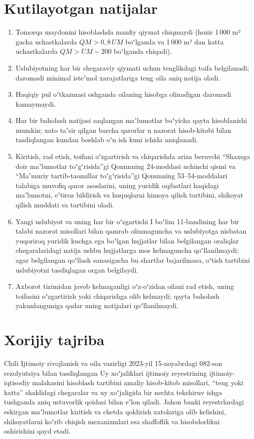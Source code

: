 \documentclass[14pt,a4paper]{extarticle}
\begin{document}
\section{Kutilayotgan natijalar}
\begin{enumerate}[leftmargin=1.27cm]
\item Tomorqa maydonini hisoblashda manfiy qiymat chiqmaydi (hozir 1\,000 m² gacha uchastkalarda $QM>0{,}8\,UM$ boʻlganda va 1\,000 m² dan katta uchastkalarda $QM>UM-200$ boʻlganda chiqadi).
\item Uslubiyotning har bir chegaraviy qiymati uchun tenglikdagi toifa belgilanadi; daromadi minimal isteʼmol xarajatlariga teng oila aniq natija oladi.
\item Haqiqiy pul oʻtkazmasi oshganda oilaning hisobga olinadigan daromadi kamaymaydi.
\item Har bir baholash natijasi saqlangan maʼlumotlar boʻyicha qayta hisoblanishi mumkin; xato taʼsir qilgan barcha qarorlar u nazorat hisob-kitobi bilan tasdiqlangan kundan boshlab oʻn ish kuni ichida aniqlanadi.
\item Kiritish, rad etish, toifani oʻzgartirish va chiqarishda ariza beruvchi “Shaxsga doir maʼlumotlar toʻgʻrisida”gi Qonunning 24-moddasi uchinchi qismi va “Maʼmuriy tartib-taomillar toʻgʻrisida”gi Qonunning 53–54-moddalari talabiga muvofiq qaror asoslarini, uning yuridik oqibatlari haqidagi maʼlumotni, eʼtiroz bildirish va huquqlarni himoya qilish tartibini, shikoyat qilish muddati va tartibini oladi.
\item Yangi uslubiyot va uning har bir oʻzgartishi I boʻlim 11-bandining har bir talabi nazorat misollari bilan qamrab olinmaguncha va uslubiyotga nisbatan yuqoriroq yuridik kuchga ega boʻlgan hujjatlar bilan belgilangan oraliqlar chegaralaridagi natija ushbu hujjatlarga mos kelmaguncha qoʻllanilmaydi; agar belgilangan qoʻllash sanasigacha bu shartlar bajarilmasa, oʻtish tartibini uslubiyotni tasdiqlagan organ belgilaydi.
\item Axborot tizimidan javob kelmaganligi oʻz-oʻzidan oilani rad etish, uning toifasini oʻzgartirish yoki chiqarishga olib kelmaydi; qayta baholash yakunlanguniga qadar uning natijalari qoʻllanilmaydi.
\end{enumerate}

\section{Xorijiy tajriba}
Chili Ijtimoiy rivojlanish va oila vazirligi 2023-yil 15-noyabrdagi 082-son rezolyutsiya bilan tasdiqlangan Uy xoʻjaliklari ijtimoiy reyestrining ijtimoiy-iqtisodiy malakasini hisoblash tartibini amaliy hisob-kitob misollari, “teng yoki katta” shaklidagi chegaralar va uy xoʻjaligida bir nechta tekshiruv ishga tushganda aniq ustuvorlik qoidasi bilan eʼlon qiladi\cite{chile}. Jahon banki reyestrlardagi eskirgan maʼlumotlar kiritish va chetda qoldirish xatolariga olib kelishini, shikoyatlarni koʻrib chiqish mexanizmlari esa shaffoflik va hisobdorlikni oshirishini qayd etadi\cite{wb2025}.
\end{document}
